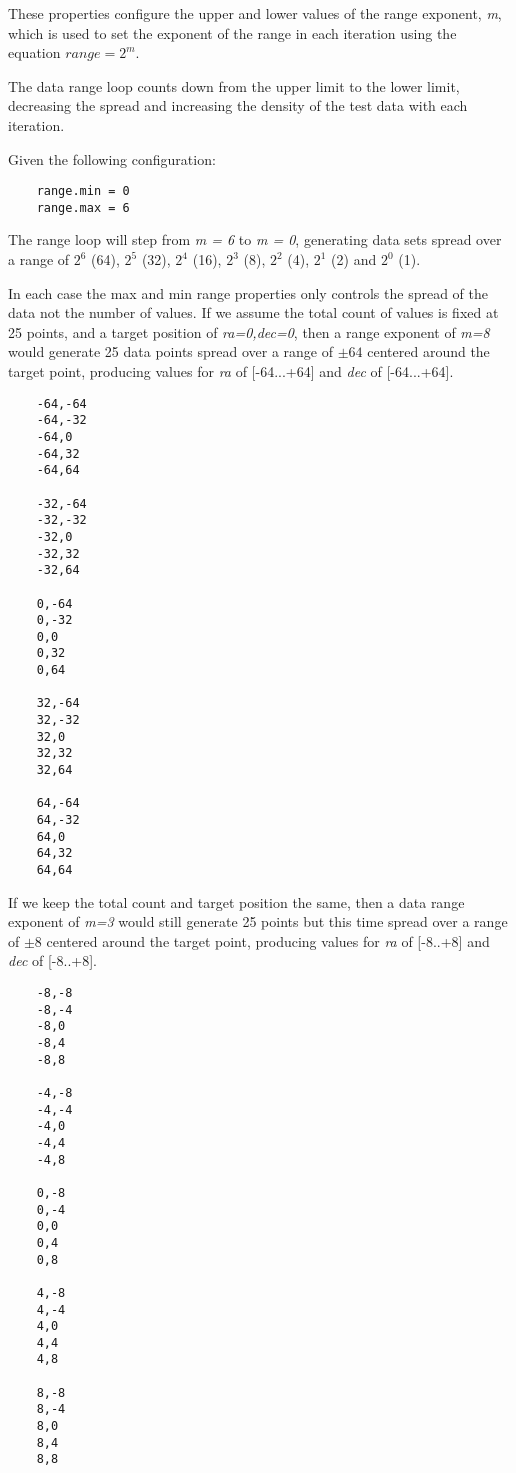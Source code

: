 \documentclass{article}
\begin{document}
These properties configure the upper and lower values of the range exponent, \textit{m}, which is used to set the exponent of the range in each iteration using the equation \(range = 2^m\).

The data range loop counts down from the upper limit to the lower limit, decreasing the spread and increasing the density of the test data with each iteration.

Given the following configuration:

\begin{lstlisting}
    range.min = 0
    range.max = 6
\end{lstlisting}

The range loop will step from \textit{m = 6} to  \textit{m = 0}, generating data sets spread over a range of 
\(2^6\) (64),
\(2^5\) (32),
\(2^4\) (16),
\(2^3\) (8),
\(2^2\) (4),
\(2^1\) (2)
and
\(2^0\) (1).

In each case the max and min range properties only controls the spread of the data not the number of values.
If we assume the total count of values is fixed at 25 points, and a target position of \textit{ra=0,dec=0}, then a range exponent of \textit{m=8} would generate 25 data points spread over a range of $\pm64$ centered around the target point, producing values for \textit{ra} of [-64...+64] and \textit{dec} of [-64...+64].

\begin{lstlisting}
    -64,-64 
    -64,-32 
    -64,0 
    -64,32
    -64,64 

    -32,-64 
    -32,-32 
    -32,0 
    -32,32 
    -32,64 

    0,-64 
    0,-32 
    0,0 
    0,32 
    0,64 

    32,-64 
    32,-32 
    32,0 
    32,32 
    32,64 

    64,-64 
    64,-32 
    64,0 
    64,32 
    64,64 
\end{lstlisting}

If we keep the total count and target position the same, then a data range exponent of \textit{m=3} would still generate 25 points but this time spread over a range of $\pm8$ centered around the target point, producing values for \textit{ra} of [-8..+8] and \textit{dec} of [-8..+8].

\begin{lstlisting}
    -8,-8 
    -8,-4 
    -8,0 
    -8,4 
    -8,8 

    -4,-8 
    -4,-4 
    -4,0 
    -4,4 
    -4,8 

    0,-8 
    0,-4 
    0,0
    0,4 
    0,8 

    4,-8 
    4,-4 
    4,0 
    4,4 
    4,8 

    8,-8 
    8,-4 
    8,0 
    8,4 
    8,8 
\end{lstlisting}
\end{document}
